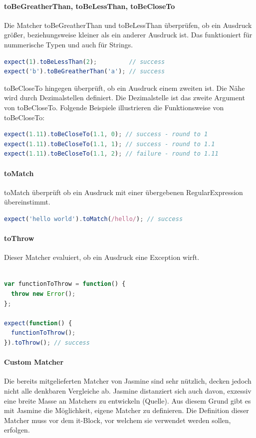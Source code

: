 {\paragraph{toBeGreatherThan, toBeLessThan, toBeCloseTo}
Die Matcher toBeGreatherThan und toBeLessThan überprüfen, ob ein Ausdruck größer, beziehungsweise kleiner als ein anderer Ausdruck ist. Das funktioniert für nummerische Typen und auch für Strings.

\begin{lstlisting}[language=JavaScript]
expect(1).toBeLessThan(2);         // success
expect('b').toBeGreatherThan('a'); // success
\end{lstlisting}

toBeCloseTo hingegen überprüft, ob ein Ausdruck  einem zweiten ist. Die Nähe wird durch Dezimalstellen definiert. Die Dezimalstelle ist das zweite Argument von toBeCloseTo. Folgende Beispiele illustrieren die Funktionsweise von toBeCloseTo:

\begin{lstlisting}[language=JavaScript]
expect(1.11).toBeCloseTo(1.1, 0); // success - round to 1
expect(1.11).toBeCloseTo(1.1, 1); // success - round to 1.1
expect(1.11).toBeCloseTo(1.1, 2); // failure - round to 1.11
\end{lstlisting}

\paragraph{toMatch}
toMatch überprüft ob ein Ausdruck mit einer übergebenen RegularExpression übereinstimmt.

\begin{lstlisting}[language=JavaScript]
expect('hello world').toMatch(/hello/); // success
\end{lstlisting}

\paragraph{toThrow}
Dieser Matcher evaluiert, ob ein Ausdruck eine Exception wirft.

\begin{lstlisting}[language=JavaScript]

var functionToThrow = function() {
  throw new Error();
};

expect(function() {
  functionToThrow();
}).toThrow(); // success
\end{lstlisting}

\paragraph{Custom Matcher}
Die bereits mitgelieferten Matcher von Jasmine sind sehr nützlich, decken jedoch nicht alle denkbaren Vergleiche ab. Jasmine distanziert sich auch davon, exzessiv eine breite Masse an Matchers zu entwickeln (Quelle). Aus diesem Grund gibt es mit Jasmine die Möglichkeit, eigene Matcher zu definieren. Die Definition dieser Matcher muss vor dem it-Block, vor welchem sie verwendet werden sollen, erfolgen.

}
